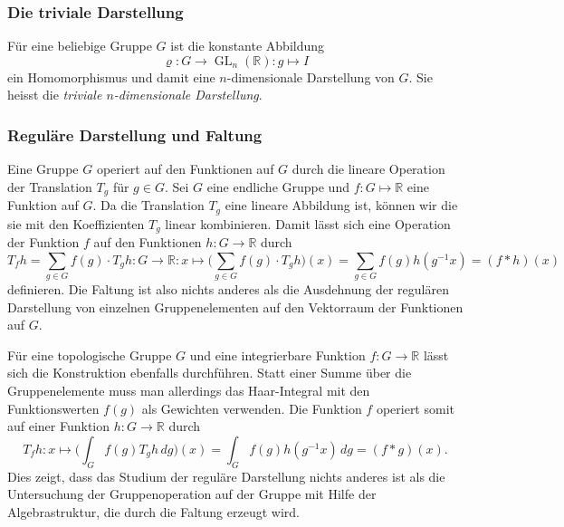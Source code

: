 %
%
\subsubsection{Die triviale Darstellung}
Für eine beliebige Gruppe $G$ ist die konstante Abbildung
\[
\varrho
\colon
G\to \operatorname{GL}_n(\mathbb{R})
:
g\mapsto I
\]
ein Homomorphismus und damit eine $n$-dimensionale Darstellung von $G$.
Sie heisst die {\em triviale $n$-dimensionale Darstellung}.

%
%
\subsubsection{Reguläre Darstellung und Faltung}
Eine Gruppe $G$ operiert auf den Funktionen auf $G$ durch die 
lineare Operation der Translation $T_g$ für $g\in G$.
Sei $G$ eine endliche Gruppe und $f\colon G\mapsto \mathbb{R}$ eine
Funktion auf $G$.
Da die Translation $T_g$ eine lineare Abbildung ist, können wir die 
sie mit den Koeffizienten $T_g$ linear kombinieren.
Damit lässt sich eine Operation der Funktion $f$ auf den Funktionen
$h\colon G\to\mathbb{R}$ durch
\begin{equation}
T_fh
=
\sum_{g\in G} f(g)\cdot T_gh
\colon
G\to\mathbb{R}
:
x\mapsto
\biggl( \sum_{g\in G} f(g)\cdot T_gh\biggr) (x)
=
\sum_{g\in G} f(g)h(g^{-1}x)
=
(f*h)(x)
\end{equation}
definieren.
Die Faltung ist also nichts anderes als die Ausdehnung der regulären
Darstellung von einzelnen Gruppenelementen auf den Vektorraum
der Funktionen auf $G$.

Für eine topologische Gruppe $G$ und eine integrierbare Funktion
$f\colon G\to\mathbb{R}$
lässt sich die Konstruktion ebenfalls durchführen.
Statt einer Summe über die Gruppenelemente muss man allerdings das
Haar-Integral mit den Funktionswerten $f(g)$ als Gewichten verwenden.
Die Funktion $f$ operiert somit auf einer Funktion $h\colon G\to\mathbb{R}$
durch 
\[
T_fh\colon
x\mapsto
\biggl(\int_G f(g) T_gh\,dg\biggr)(x)
=
\int_G f(g) h(g^{-1}x)\,dg
=
(f*g)(x).
\]
Dies zeigt, dass das Studium der reguläre Darstellung nichts anderes
ist als die Untersuchung der Gruppenoperation auf der Gruppe mit Hilfe
der Algebrastruktur, die durch die Faltung erzeugt wird.

